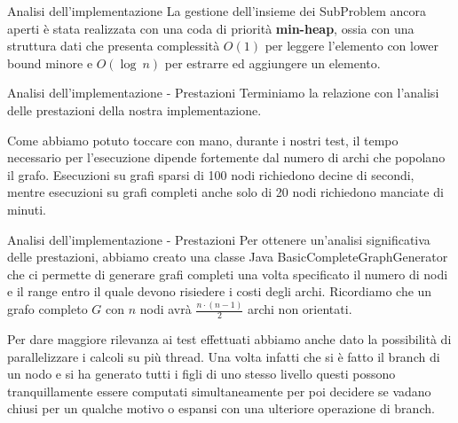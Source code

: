 \documentclass[10pt]{beamer}
\begin{document}
    \begin{frame}{Analisi dell'implementazione}
        La gestione dell'insieme dei {\selectfont SubProblem} ancora aperti è stata realizzata con una coda di priorità \textbf{min-heap}, ossia con una struttura dati che presenta complessità $O(1)$ per leggere l'elemento con lower bound minore e $O(\log\:n)$ per estrarre ed aggiungere un elemento.
    \end{frame}

    \begin{frame}{Analisi dell'implementazione - Prestazioni}
        Terminiamo la relazione con l'analisi delle prestazioni della nostra implementazione.

        Come abbiamo potuto toccare con mano, durante i nostri test, il tempo necessario per l'esecuzione dipende fortemente dal numero di archi che popolano il grafo.
        Esecuzioni su grafi sparsi di 100 nodi richiedono decine di secondi, mentre esecuzioni su grafi completi anche solo di 20 nodi richiedono manciate di minuti.
    \end{frame}

    \begin{frame}{Analisi dell'implementazione - Prestazioni}
        Per ottenere un'analisi significativa delle prestazioni, abbiamo creato una classe Java {\selectfont BasicCompleteGraphGenerator} che ci permette di generare grafi completi una volta specificato il numero di nodi e il range entro il quale devono risiedere i costi degli archi.
        Ricordiamo che un grafo completo $G$ con $n$ nodi avrà $\frac{n\cdot (n-1)}{2}$ archi non orientati.


        Per dare maggiore rilevanza ai test effettuati abbiamo anche dato la possibilità di parallelizzare i calcoli su più thread.
        Una volta infatti che si è fatto il branch di un nodo e si ha generato tutti i figli di uno stesso livello questi possono tranquillamente essere computati simultaneamente per poi decidere se vadano chiusi per un qualche motivo o espansi con una ulteriore operazione di branch.
    \end{frame}
\end{document}
